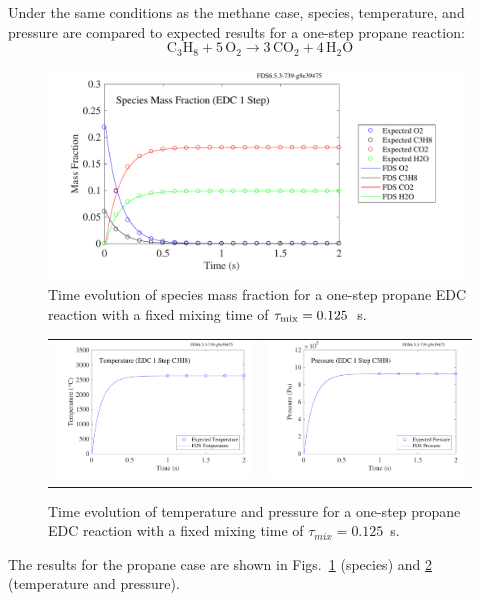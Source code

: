 \documentclass[11pt]{book}
\begin{document}
Under the same conditions as the methane case, species, temperature, and pressure are compared to expected results for a one-step propane reaction:
\begin{equation}\label{eq:1step_propane}
\mathrm{C_3H_8 + 5\, O_2 \rightarrow  3\, CO_2 + 4\, H_2O}
\end{equation}
\begin{figure}[h!]
\begin{center}
\includegraphics[height=2.2in]{SCRIPT_FIGURES/reactionrate_EDC_flim_1step_C3H8_spec}
\caption[Species evolution in a 1-step propane EDC reaction]{Time evolution of species mass fraction for a one-step propane EDC reaction with a fixed mixing time of $\tau_{\rm mix}=0.125$~s.}
\label{fig:EDC_1Step_prop_spec}
\end{center}
\end{figure}
\begin{figure}[h!]
\begin{tabular*}{\textwidth}{lr}
\includegraphics[width=3.2in]{SCRIPT_FIGURES/reactionrate_EDC_flim_1step_C3H8_temp} &
\includegraphics[width=3.2in]{SCRIPT_FIGURES/reactionrate_EDC_flim_1step_C3H8_pres}
\end{tabular*}
\caption[Temperature and pressure evolution in a 1-step propane EDC reaction]{Time evolution of temperature and pressure for a one-step propane EDC reaction with a fixed mixing time of $\tau_{mix}=0.125$~s.}
\label{fig:EDC_1Step_prop_temppres}
\end{figure}
The results for the propane case are shown in Figs.~\ref{fig:EDC_1Step_prop_spec} (species) and \ref{fig:EDC_1Step_prop_temppres} (temperature and pressure).
\end{document}
